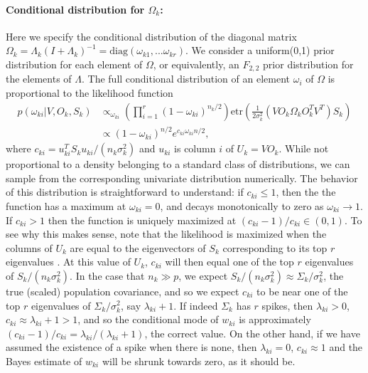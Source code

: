\documentclass[12pt]{article}
\newcommand{\etr}{\text{etr}}
\begin{document}
\paragraph{Conditional distribution for $\Omega_k$:} Here we specify the
conditional distribution of the diagonal matrix
$\Omega_k = \Lambda_k(I+\Lambda_k)^{-1} = \text{diag}(\omega_{k1},
... \omega_{kr})$.
We consider a uniform(0,1) prior distribution for each element of
$\Omega$, or equivalently, an $F_{2,2}$ prior distribution for the
elements of $\Lambda$.  The full conditional distribution of an
element $\omega_i$ of $\Omega$ is proportional to the likelihood
function
\begin{align}
p(\omega_{ki}|V, O_k, S_k) &\propto_{\omega_{ki}}
  \left(\prod_{i=1}^r(1-\omega_{ki})^{n_k/2}  \right)
  \etr(\frac{1}{2\sigma_k^2}(VO_k\Omega_kO_k^TV^T)S_k) \\
&  \propto  (1-\omega_{ki})^{n/2} e^{c_{ki} \omega_{ki}  n/2},    
\label{eqn:wpost}
\end{align}
%
\noindent where $c_{ki} = u_{ki}^T S_k u_{ki}/(n_k \sigma^2_k)$ and $ u_{ki}$ is
column $i$ of $U_k = VO_k$.  While not proportional to a density
belonging to a standard class of distributions, we can sample from the
corresponding univariate distribution numerically.  The behavior of
this distribution is straightforward to understand: if $c_{ki}\leq 1$, then
the the function has a maximum at $\omega_{ki} =0$, and decays
monotonically to zero as $\omega_{ki} \rightarrow 1$.  If $c_{ki}>1$ then the
function is uniquely maximized at $(c_{ki}-1)/c_{ki} \in (0,1)$.  To see why
this makes sense, note that the likelihood is maximized when the
columns of $ U_k$ are equal to the eigenvectors of $S_k$
corresponding to its top $r$ eigenvalues
\citep{Tipping1999}. At this value of $U_k$, $c_{ki}$ will then
equal one of the top $r$ eigenvalues of $ S_k/(n_k\sigma_k^2)$.  In the
case that $n_k\gg p$, we expect
$ S_k/(n_k\sigma_k^2)\approx \Sigma_k/\sigma_k^2$, the true (scaled)
population covariance, and so we expect $c_{ki}$ to be near one of the top
$r$ eigenvalues of $\Sigma_k/\sigma^2_k$, say $\lambda_{ki}+1$.  If indeed
$\Sigma_k$ has $r$ spikes, then $\lambda_{ki}>0$,
$c_{ki} \approx \lambda_{ki} +1 > 1$, and so the conditional mode of $w_{ki}$ is
approximately $(c_{ki}-1)/c_{ki} = \lambda_{ki}/(\lambda_{ki}+1)$, the correct value.
On the other hand, if we have assumed the existence of a spike when
there is none, then $\lambda_{ki}=0$, $c_{ki}\approx 1$ and the Bayes estimate
of $w_{ki}$ will be shrunk towards zero, as it should be.
\end{document}
